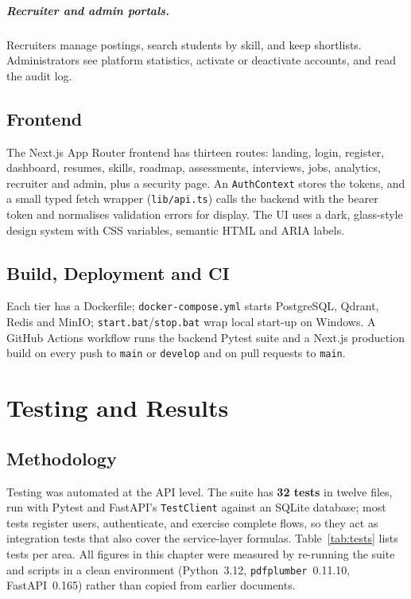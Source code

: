 \documentclass[openany]{tietreport}
\newcommand{\code}[1]{\texttt{\small #1}}
\begin{document}
\paragraph{Recruiter and admin portals.} Recruiters manage postings, search students by skill, and keep shortlists. Administrators see platform statistics, activate or deactivate accounts, and read the audit log.

\section{Frontend}
The Next.js App Router frontend has thirteen routes: landing, login, register, dashboard, resumes, skills, roadmap, assessments, interviews, jobs, analytics, recruiter and admin, plus a security page. An \code{AuthContext} stores the tokens, and a small typed fetch wrapper (\code{lib/api.ts}) calls the backend with the bearer token and normalises validation errors for display. The UI uses a dark, glass-style design system with CSS variables, semantic HTML and ARIA labels.

\section{Build, Deployment and CI}
Each tier has a Dockerfile; \code{docker-compose.yml} starts PostgreSQL, Qdrant, Redis and MinIO; \code{start.bat}/\code{stop.bat} wrap local start-up on Windows. A GitHub Actions workflow runs the backend Pytest suite and a Next.js production build on every push to \code{main} or \code{develop} and on pull requests to \code{main}.

\chapter{Testing and Results}

\section{Methodology}
Testing was automated at the API level. The suite has \textbf{32 tests} in twelve files, run with Pytest and FastAPI's \code{TestClient} against an SQLite database; most tests register users, authenticate, and exercise complete flows, so they act as integration tests that also cover the service-layer formulas. Table~\ref{tab:tests} lists tests per area. All figures in this chapter were measured by re-running the suite and scripts in a clean environment (Python~3.12, \code{pdfplumber}~0.11.10, FastAPI~0.165) rather than copied from earlier documents.
\end{document}
